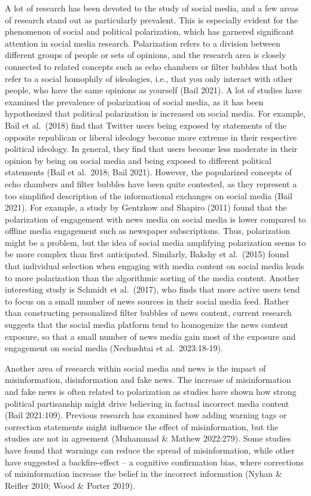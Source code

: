 \documentclass[
]{article}
\begin{document}
A lot of research has been devoted to the study of social media, and a
few areas of research stand out as particularly prevalent. This is
especially evident for the phenomenon of social and political
polarization, which has garnered significant attention in social media
research. Polarization refers to a division between different groups of
people or sets of opinions, and the research area is closely connected
to related concepts such as echo chambers or filter bubbles that both
refer to a social homophily of ideologies, i.e., that you only interact
with other people, who have the same opinions as yourself (Bail 2021). A
lot of studies have examined the prevalence of polarization of social
media, as it has been hypothesized that political polarization is
increased on social media. For example, Bail et al.~(2018) find that
Twitter users being exposed by statements of the opposite republican or
liberal ideology become more extreme in their respective political
ideology. In general, they find that users become less moderate in their
opinion by being on social media and being exposed to different
political statements (Bail et al.~2018; Bail 2021). However, the
popularized concepts of echo chambers and filter bubbles have been quite
contested, as they represent a too simplified description of the
informational exchanges on social media (Bail 2021). For example, a
study by Gentzkow and Shapiro (2011) found that the polarization of
engagement with news media on social media is lower compared to offline
media engagement such as newspaper subscriptions. Thus, polarization
might be a problem, but the idea of social media amplifying polarization
seems to be more complex than first anticipated. Similarly, Bakshy et
al.~(2015) found that individual selection when engaging with media
content on social media leads to more polarization than the algorithmic
sorting of the media content. Another interesting study is Schmidt et
al.~(2017), who finds that more active users tend to focus on a small
number of news sources in their social media feed. Rather than
constructing personalized filter bubbles of news content, current
research suggests that the social media platform tend to homogenize the
news content exposure, so that a small number of news media gain most of
the exposure and engagement on social media (Nechushtai et
al.~2023:18-19).

Another area of research within social media and news is the impact of
misinformation, disinformation and fake news. The increase of
misinformation and fake news is often related to polarization as studies
have shown how strong political partisanship might drive believing in
factual incorrect media content (Bail 2021:109). Previous research has
examined how adding warning tags or correction statements might
influence the effect of misinformation, but the studies are not in
agreement (Muhammad \& Mathew 2022:279). Some studies have found that
warnings can reduce the spread of misinformation, while other have
suggested a backfire-effect -- a cognitive confirmation bias, where
corrections of misinformation increase the belief in the incorrect
information (Nyhan \& Reifler 2010; Wood \& Porter 2019).
\end{document}
